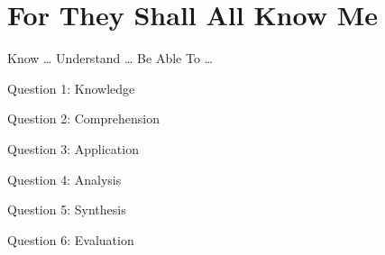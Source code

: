 \chapter{For They Shall All Know Me}

\begin{goals}
\goal Know \ldots
\goal Understand \ldots
\goal Be Able To \ldots
\end{goals}

\intro

\lipsum[4]

\bible

\begin{quote}
\lipsum[4] 
\end{quote}

\begin{quote}
\lipsum[4] 
\end{quote}

\begin{quote}
\lipsum[4] 
\end{quote}

\begin{quote}
\lipsum[4] 
\end{quote}

\discussion

\lipsum[5-7]

\questions

Question 1: Knowledge
\vfill

Question 2: Comprehension
\vfill

Question 3: Application
\vfill

Question 4: Analysis
\vfill

Question 5: Synthesis
\vfill

Question 6: Evaluation
\vfill